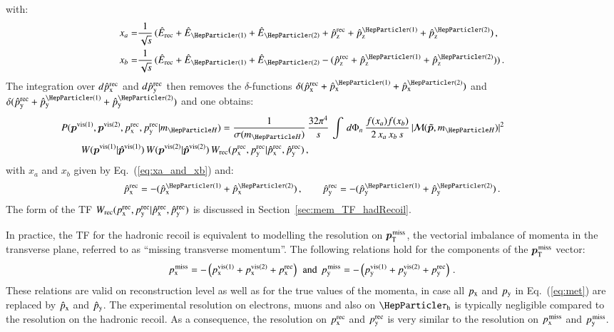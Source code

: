 with:
\begin{align}
x_{a} = & \frac{1}{\sqrt{s}} \, (\Ehat_{\rec} + \Ehat_{\Pgt(1)} +
\Ehat_{\Pgt(2)} + \pZhat^{\rec} + \pZhat^{\Pgt(1)} + \pZhat^{\Pgt(2)})
\, , \nonumber \\
x_{b} = & \frac{1}{\sqrt{s}} \, (\Ehat_{\rec} + \Ehat_{\Pgt(1)} + \Ehat_{\Pgt(2)} - (\pZhat^{\rec} + \pZhat^{\Pgt(1)} + \pZhat^{\Pgt(2)})) \, .
\label{eq:xa_and_xb}
\end{align}
The integration over $d\hat{p}_{\textrm{x}}^{\textrm{rec}}$ and $d\hat{p}_{\textrm{y}}^{\textrm{rec}}$ then removes the $\delta$-functions 
$\delta( \pXhat^{\rec} + \pXhat^{\Pgt(1)} + \pXhat^{\Pgt(2)} )$ and
$\delta( \pYhat^{\rec} + \pYhat^{\Pgt(1)} + \pYhat^{\Pgt(2)} )$ and one obtains:
\begin{align}
&
P(\bm{p}^{\vis(1)},\bm{p}^{\vis(2)},\pX^{\rec},\pY^{\rec}|m_{\PHiggs})
= \frac{1}{\sigma(m_{\PHiggs})} \, \frac{32\pi^{4}}{s} \, \int \,
d\Phi_{n} \, \frac{f(x_{a}) f(x_{b})}{2 \, x_{a} \, x_{b} \, s} \, \vert \mathcal{M}(\bm{\tilde{p}},m_{\PHiggs}) \vert^{2} \, \hspace{2cm} \nonumber \\
& \qquad W(\bm{p}^{\vis(1)}|\hat{\bm{p}}^{\vis(1)}) \, W(\bm{p}^{\vis(2)}|\hat{\bm{p}}^{\vis(2)}) \, W_{\rec}( \pX^{\rec},\pY^{\rec} | \pXhat^{\rec},\pYhat^{\rec} ) \, ,
\label{eq:mem_with_hadRecoil}
\end{align}
with $x_{a}$ and $x_{b}$ given by Eq.~(\ref{eq:xa_and_xb}) and:
\begin{equation}
\pXhat^{\rec} = -(\pXhat^{\Pgt(1)} + \pXhat^{\Pgt(2)}) \, ,
\qquad \pYhat^{\rec} = -(\pYhat^{\Pgt(1)} + \pYhat^{\Pgt(2)}) \, .
\label{eq:xpXhat_and_pYhat}
\end{equation}
The form of the TF $W_{\textrm{rec}}( p_{\textrm{x}}^{\textrm{rec}},p_{\textrm{y}}^{\textrm{rec}} | \hat{p}_{\textrm{x}}^{\textrm{rec}},\hat{p}_{\textrm{y}}^{\textrm{rec}} )$ is
discussed in Section~\ref{sec:mem_TF_hadRecoil}.

In practice, the TF for the hadronic recoil is equivalent to modelling
the resolution on $\bm{p}_{\textrm{T}}^{\textrm{\kern0.10em miss}}$, the vectorial imbalance of momenta in the
transverse plane, referred to as ``missing transverse momentum''.
The following relations hold for the components of the $\bm{p}_{\textrm{T}}^{\textrm{\kern0.10em miss}}$
vector:
\begin{equation}
p_{\textrm{x}}^{\textrm{\kern0.10em miss}} = - \left( p_{\textrm{x}}^{\textrm{vis}(1)} + p_{\textrm{x}}^{\textrm{vis}(2)} + p_{\textrm{x}}^{\textrm{rec}} \right)
\, \mbox { and } \,
p_{\textrm{y}}^{\textrm{\kern0.10em miss}} = - \left( p_{\textrm{y}}^{\textrm{vis}(1)} + p_{\textrm{y}}^{\textrm{vis}(2)} + p_{\textrm{y}}^{\textrm{rec}} \right) \, .
\label{eq:met}
\end{equation}
These relations are valid on reconstruction level as well as for the
true values of the momenta, \ie in case all $p_{\textrm{x}}$ and $p_{\textrm{y}}$ in
Eq.~(\ref{eq:met}) are replaced by $\hat{p}_{\textrm{x}}$ and $\hat{p}_{\textrm{y}}$.
The experimental resolution on electrons, muons and also on $\tauh$ is typically negligible compared to the resolution on the hadronic recoil.
As a consequence, the resolution on $p_{\textrm{x}}^{\textrm{rec}}$ and $p_{\textrm{y}}^{\textrm{rec}}$ is
very similar to the resolution on $p_{\textrm{x}}^{\textrm{\kern0.10em miss}}$ and $p_{\textrm{y}}^{\textrm{\kern0.10em miss}}$.

